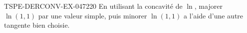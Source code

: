 \begin{exercice}{TSPE-DERCONV-EX-047}{2}{20}
En utilisant la concavité de $\ln$, majorer $\ln(1{,}1)$ par une valeur simple, puis minorer $\ln(1{,}1)$ a l'aide d'une autre tangente bien choisie.

\end{exercice}
